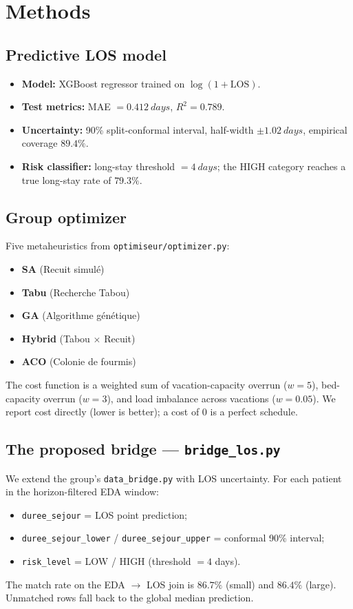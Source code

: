 \documentclass[11pt,a4paper]{article}
\begin{document}
\section{Methods}

\subsection{Predictive LOS model}
\begin{itemize}[nosep]
  \item \textbf{Model:} XGBoost regressor trained on \(\log(1+\mathrm{LOS})\).
  \item \textbf{Test metrics:} MAE \(= \SI{0.412}{days}\), \(R^2 = 0.789\).
  \item \textbf{Uncertainty:} 90\% split-conformal interval, half-width \(\pm \SI{1.02}{days}\), empirical coverage \(89.4\%\).
  \item \textbf{Risk classifier:} long-stay threshold \(= \SI{4}{days}\); the HIGH category reaches a true long-stay rate of \(79.3\%\).
\end{itemize}

\subsection{Group optimizer}
Five metaheuristics from \texttt{optimiseur/optimizer.py}:
\begin{itemize}[nosep]
  \item \textbf{SA} (Recuit simul\'e)
  \item \textbf{Tabu} (Recherche Tabou)
  \item \textbf{GA} (Algorithme g\'en\'etique)
  \item \textbf{Hybrid} (Tabou \(\times\) Recuit)
  \item \textbf{ACO} (Colonie de fourmis)
\end{itemize}
The cost function is a weighted sum of vacation-capacity overrun (\(w=5\)), bed-capacity overrun (\(w=3\)), and load imbalance across vacations (\(w=0.05\)). We report cost directly (lower is better); a cost of \(0\) is a perfect schedule.

\subsection{The proposed bridge --- \texttt{bridge\_los.py}}
We extend the group's \texttt{data\_bridge.py} with LOS uncertainty. For each patient in the horizon-filtered EDA window:
\begin{itemize}[nosep]
  \item \texttt{duree\_sejour} = LOS point prediction;
  \item \texttt{duree\_sejour\_lower} / \texttt{duree\_sejour\_upper} = conformal 90\% interval;
  \item \texttt{risk\_level} = LOW / HIGH (threshold \(=4\) days).
\end{itemize}
The match rate on the EDA \(\to\) LOS join is \(86.7\%\) (small) and \(86.4\%\) (large). Unmatched rows fall back to the global median prediction.
\end{document}
